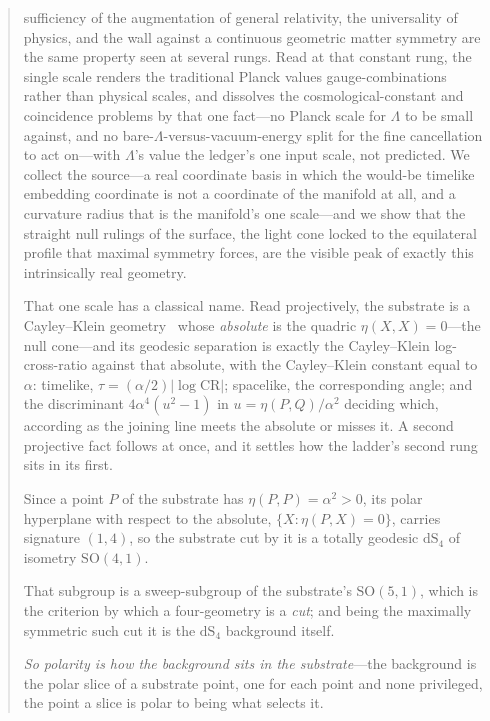 \documentclass[11pt,a4paper]{article}
\theoremstyle{definition}
\begin{document}
\begin{abstract}
sufficiency of the augmentation of general relativity, the universality of
physics, and the wall against a continuous geometric matter symmetry are the
same property seen at several rungs. Read at that constant rung, the single
scale renders the traditional Planck values gauge-combinations rather than
physical scales, and dissolves the cosmological-constant and coincidence
problems by that one fact---no Planck scale for $\Lambda$ to be small against,
and no bare-$\Lambda$-versus-vacuum-energy split for the fine cancellation to
act on---with $\Lambda$'s value the ledger's one input scale, not predicted. We collect the source---a real
coordinate basis in which the would-be timelike embedding coordinate is not a
coordinate of the manifold at all, and a curvature radius that is the
manifold's one scale---and we show that the straight null rulings of the
surface, the light cone locked to the equilateral profile that maximal
symmetry forces, are the visible peak of exactly this intrinsically real
geometry. 

That one scale has a classical name. Read projectively, the
substrate is a Cayley--Klein geometry~\cite{Cayley1859,Klein1871} whose \emph{absolute} is the quadric
$\eta(X,X)=0$---the null cone---and its geodesic separation is exactly the
Cayley--Klein log-cross-ratio against that absolute, with the Cayley--Klein
constant equal to $\alpha$: timelike, $\tau=(\alpha/2)\lvert\log\mathrm{CR}\rvert$;
spacelike, the corresponding angle; and the discriminant $4\alpha^{4}(u^{2}-1)$
in $u=\eta(P,Q)/\alpha^{2}$ deciding which, according as the joining line meets
the absolute or misses it. A second projective fact follows at once, and it settles how the ladder's second rung sits in its first. 

Since a point $P$ of the substrate has $\eta(P,P)=\alpha^{2}>0$, its polar hyperplane with respect to the absolute, $\{X:\eta(P,X)=0\}$, carries signature $(1,4)$, so the substrate cut by it is a totally geodesic $\mathrm{dS}_{4}$ of isometry $\mathrm{SO}(4,1)$. 

That subgroup is a sweep-subgroup of the substrate's $\mathrm{SO}(5,1)$, which is the criterion by which a four-geometry is a \emph{cut}; and being the maximally symmetric such cut it is the $\mathrm{dS}_{4}$ background itself. 

\emph{So polarity is how the background sits in the substrate}---the background is the polar slice of a substrate point, one for each point and none privileged, the point a slice is polar to being what selects it. 


\end{abstract}
\end{document}
